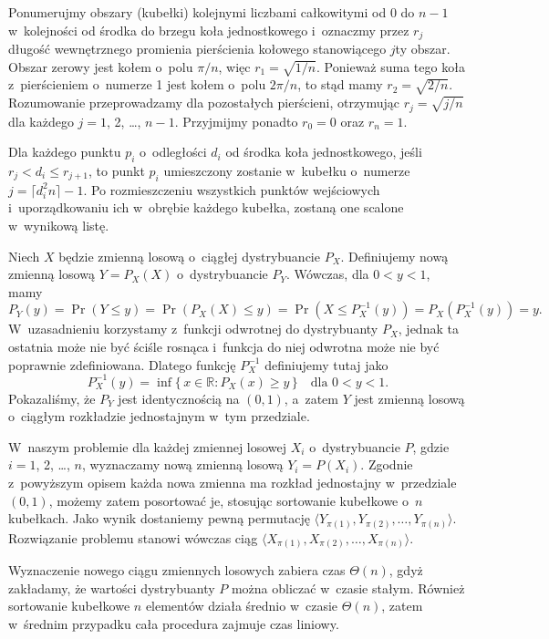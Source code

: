 Ponumerujmy obszary (kubełki) kolejnymi liczbami całkowitymi od 0 do $n-1$ w~kolejności od środka do brzegu koła jednostkowego i~oznaczmy przez $r_j$ długość wewnętrznego promienia pierścienia kołowego stanowiącego $j$\nbhyphen ty obszar.
Obszar zerowy jest kołem o~polu $\pi/n$, więc $r_1=\sqrt{1/n}$.
Ponieważ suma tego koła z~pierścieniem o~numerze 1 jest kołem o~polu $2\pi/n$, to stąd mamy $r_2=\sqrt{2/n}$.
Rozumowanie przeprowadzamy dla pozostałych pierścieni, otrzymując $r_j=\sqrt{j/n}$ dla każdego $j=1$, 2, \dots, $n-1$.
Przyjmijmy ponadto $r_0=0$ oraz $r_n=1$.

Dla każdego punktu $p_i$ o~odległości $d_i$ od środka koła jednostkowego, jeśli $r_j<d_i\le r_{j+1}$, to punkt $p_i$ umieszczony zostanie w~kubełku o~numerze $j=\lceil d_i^2n\rceil-1$.
Po rozmieszczeniu wszystkich punktów wejściowych i~uporządkowaniu ich w~obrębie każdego kubełka, zostaną one scalone w~wynikową listę.

\exercise %
Niech $X$ będzie zmienną losową o~ciągłej dystrybuancie $P_X$.
Definiujemy nową zmienną losową $Y=P_X(X)$ o~dystrybuancie $P_Y$.
Wówczas, dla $0<y<1$, mamy
\[
    P_Y(y) = \Pr(Y\le y) = \Pr(P_X(X)\le y) = \Pr(X\le P_X^{-1}(y)) = P_X(P_X^{-1}(y)) = y.
\]
W~uzasadnieniu korzystamy z~funkcji odwrotnej do dystrybuanty $P_X$, jednak ta ostatnia może nie być ściśle rosnąca i~funkcja do niej odwrotna może nie być poprawnie zdefiniowana.
Dlatego funkcję $P_X^{-1}$ definiujemy tutaj jako
\[
	P_X^{-1}(y) = \inf\{\,x\in\mathbb{R}:P_X(x)\ge y\,\} \quad\text{dla $0<y<1$}.
\]
Pokazaliśmy, że $P_Y$ jest identycznością na $(0,1)$, a~zatem $Y$ jest zmienną losową o~ciągłym rozkładzie jednostajnym w~tym przedziale.

W~naszym problemie dla każdej zmiennej losowej $X_i$ o~dystrybuancie $P$, gdzie $i=1$, 2, \dots, $n$, wyznaczamy nową zmienną losową $Y_i=P(X_i)$.
Zgodnie z~powyższym opisem każda nowa zmienna ma rozkład jednostajny w~przedziale $(0,1)$, możemy zatem posortować je, stosując sortowanie kubełkowe o~$n$ kubełkach.
Jako wynik dostaniemy pewną permutację $\langle Y_{\pi(1)},Y_{\pi(2)},\dots,Y_{\pi(n)}\rangle$.
Rozwiązanie problemu stanowi wówczas ciąg $\langle X_{\pi(1)},X_{\pi(2)},\dots,X_{\pi(n)}\rangle$.

Wyznaczenie nowego ciągu zmiennych losowych zabiera czas $\Theta(n)$, gdyż zakładamy, że wartości dystrybuanty $P$ można obliczać w~czasie stałym.
Również sortowanie kubełkowe $n$ elementów działa średnio w~czasie $\Theta(n)$, zatem w~średnim przypadku cała procedura zajmuje czas liniowy.
